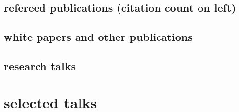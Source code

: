 \documentclass[]{luger-cv} %
\begin{document}
\ifdefined \withpubs
    \newpage
    \begin{changemargin}{-4.5cm}{0cm}
        \section{refereed publications {\small \normalfont (citation count on left)}}
    \end{changemargin}
\begin{changemargin}{-4.1cm}{0cm}
    \begin{list}{}{\pubslist}
        
    \end{list}
    \vspace{1em}
\end{changemargin}

\begin{changemargin}{-4.5cm}{0cm}
    \section{white papers and other publications}
\end{changemargin}
\begin{changemargin}{-4.1cm}{0cm}
    \begin{list}{}{\pubslist}
        
    \end{list}
    \vspace{1em}
\end{changemargin}
\fi
\begin{changemargin}{-4.5cm}{0cm}
\ifdefined \withtalks
    \section{research talks}
\end{changemargin}
\begin{changemargin}{-4.1cm}{0cm}
    \begin{list}{}{\pubslist}
        
    \end{list}
\fi
\end{changemargin}


\ifdefined \withselecttalks
    \vspace*{-0.9cm}
    \section{selected talks}
    \begin{list}{}{\pubslist}
        
    \end{list}
\fi
\end{document}

